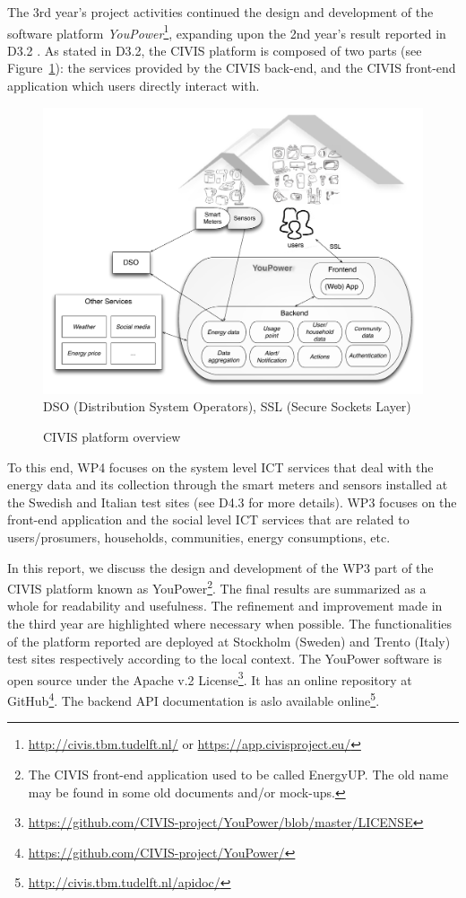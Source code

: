 The 3rd year's project activities continued the design and development of the software platform \textit{YouPower}\footnote{\url{http://civis.tbm.tudelft.nl/} or \url{https://app.civisproject.eu/}}, expanding upon the 2nd year's result reported in D3.2 \citep{Huang2015c}. 
As stated in D3.2, the CIVIS platform is composed of two parts (see Figure~\ref{fig:platform}): the services provided by the CIVIS back-end, and the CIVIS front-end application which users directly interact with. 
%
\begin{figure}[h!]
\begin{center}\footnotesize
	\includegraphics[width=.95\textwidth]{img/civis_platform_overview.pdf}\\
	DSO (Distribution System Operators),  SSL (Secure Sockets Layer)
	\caption{CIVIS platform overview}\label{fig:platform}
\end{center}
\end{figure}
% 
To this end, WP4 focuses on the system level ICT services that deal with the energy data and its collection through the smart meters and sensors installed at the Swedish and Italian test sites (see D4.3 for more details). 
% 
WP3 focuses on the front-end application and the social level ICT services that are related to users/prosumers, households, communities, energy consumptions, etc. 

In this report, we discuss the design and development of the WP3 part of the CIVIS platform known as YouPower\footnote{The CIVIS front-end application used to be called EnergyUP. The old name may be found in some old documents and/or mock-ups.}. 
The final results are summarized as a whole for readability and usefulness. The refinement and improvement made in the third year are highlighted where necessary when possible. 
% 
The functionalities of the platform reported are deployed at Stockholm (Sweden) and Trento (Italy) test sites respectively according to the local context. The YouPower software is open source under the Apache v.2 License\footnote{\url{https://github.com/CIVIS-project/YouPower/blob/master/LICENSE}}. It has  an online repository at GitHub\footnote{ \url{https://github.com/CIVIS-project/YouPower/}}. 
The backend API documentation is aslo available online\footnote{ \url{http://civis.tbm.tudelft.nl/apidoc/}}. 

